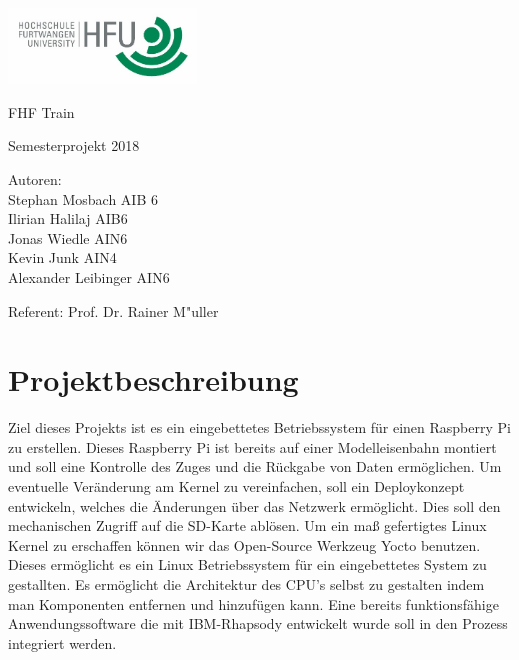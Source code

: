 \documentclass [a4paper,10pt] {article}
\begin{document}
\begin{titlepage}
	\raggedleft
	\includegraphics[width=5cm]{HFULogo}\par\vspace{1cm}

	\centering
	\vfill

	\LARGE FHF Train \par
	\vspace{1cm}
	
	\Large Semesterprojekt 2018 \\
	\vfill
	
	\Large Autoren: \\ 
	Stephan Mosbach AIB 6 \\
 	Ilirian Halilaj AIB6 \\ 
	Jonas Wiedle AIN6 \\ 
	Kevin Junk AIN4 \\
	Alexander Leibinger AIN6\par
	
	\vfill
	Referent: Prof. Dr. Rainer M"uller\par

	\vfill
\end{titlepage}


\newpage

\tableofcontents
	
\newpage
	\section{Projektbeschreibung}
	
		Ziel dieses Projekts ist es ein eingebettetes Betriebssystem für einen Raspberry Pi zu erstellen. Dieses Raspberry Pi ist bereits auf einer Modelleisenbahn montiert und soll eine Kontrolle des Zuges und die Rückgabe von Daten ermöglichen.
		Um eventuelle Veränderung am Kernel zu vereinfachen, soll ein Deploykonzept entwickeln, welches die Änderungen über das Netzwerk ermöglicht. Dies soll den mechanischen Zugriff auf die SD-Karte ablösen.
		Um ein maß gefertigtes Linux Kernel zu erschaffen können wir das Open-Source Werkzeug Yocto benutzen. Dieses ermöglicht es ein Linux Betriebssystem für ein eingebettetes System zu gestallten. Es ermöglicht die Architektur des CPU’s selbst zu gestalten indem man Komponenten entfernen und hinzufügen kann.
		Eine bereits funktionsfähige Anwendungssoftware die mit IBM-Rhapsody entwickelt wurde soll in den Prozess integriert werden.
\end{document}
